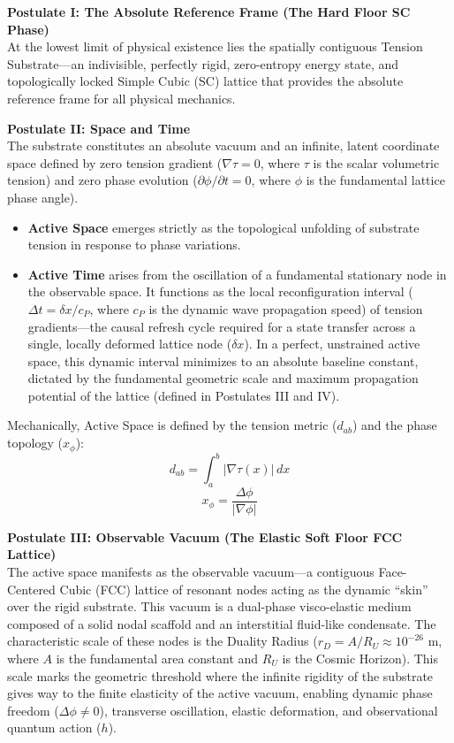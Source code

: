 \vspace{0.5em}
\noindent\textbf{Postulate I: The Absolute Reference Frame (The Hard Floor SC Phase)}\\
At the lowest limit of physical existence lies the spatially contiguous Tension Substrate---an indivisible, perfectly rigid, zero-entropy energy state, and topologically locked Simple Cubic (SC) lattice that provides the absolute reference frame for all physical mechanics.

\vspace{0.5em}
\noindent\textbf{Postulate II: Space and Time}\\
The substrate constitutes an absolute vacuum and an infinite, latent coordinate space defined by zero tension gradient ($\nabla\tau = 0$, where $\tau$ is the scalar volumetric tension) and zero phase evolution ($\partial\phi/\partial t = 0$, where $\phi$ is the fundamental lattice phase angle).
\begin{itemize}
    \item \textbf{Active Space} emerges strictly as the topological unfolding of substrate tension in response to phase variations.
    \item \textbf{Active Time} arises from the oscillation of a fundamental stationary node in the observable space. It functions as the local reconfiguration interval ($\Delta t = \delta x / c_P$, where $c_P$ is the dynamic wave propagation speed) of tension gradients---the causal refresh cycle required for a state transfer across a single, locally deformed lattice node ($\delta x$). In a perfect, unstrained active space, this dynamic interval minimizes to an absolute baseline constant, dictated by the fundamental geometric scale and maximum propagation potential of the lattice (defined in Postulates III and IV).
\end{itemize}
Mechanically, Active Space is defined by the tension metric ($d_{ab}$) and the phase topology ($x_\phi$):
\begin{equation}
    d_{ab} = \int_a^b |\nabla\tau(x)| \, dx
\end{equation}
\begin{equation}
    x_\phi = \frac{\Delta\phi}{|\nabla\phi|}
\end{equation}

\vspace{0.5em}
\noindent\textbf{Postulate III: Observable Vacuum (The Elastic Soft Floor FCC Lattice)}\\
The active space manifests as the observable vacuum---a contiguous Face-Centered Cubic (FCC) lattice of resonant nodes acting as the dynamic ``skin'' over the rigid substrate. This vacuum is a dual-phase visco-elastic medium composed of a solid nodal scaffold and an interstitial fluid-like condensate. The characteristic scale of these nodes is the Duality Radius ($r_D = A/R_U \approx 10^{-26} \text{ m}$, where $A$ is the fundamental area constant and $R_U$ is the Cosmic Horizon). This scale marks the geometric threshold where the infinite rigidity of the substrate gives way to the finite elasticity of the active vacuum, enabling dynamic phase freedom ($\Delta\phi \neq 0$), transverse oscillation, elastic deformation, and observational quantum action ($h$).


